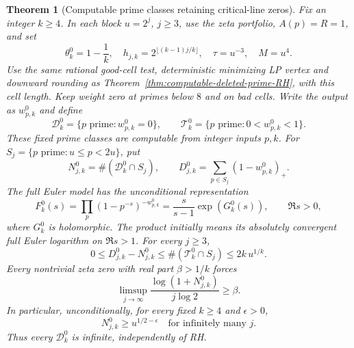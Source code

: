 \documentclass[11pt]{article}
\newtheorem{theorem}{Theorem}[section]
\theoremstyle{definition}
\begin{document}
\begin{theorem}[Computable prime classes retaining critical-line zeros]
\label{thm:critical-deleted-prime-model}
Fix an integer $k\ge4$. In each block $u=2^j$, $j\ge3$,
use the zeta portfolio, $A(p)=R=1$, and set
\begin{equation}
 \theta_k^0=1-\frac1k,\quad
 h_{j,k}=2^{\lfloor(k-1)j/k\rfloor},\quad
 \tau=u^{-3},\quad M=u^4.
 \label{eq:critical-prime-cell-scale}
\end{equation}
Use the same rational good-cell test, deterministic minimizing
LP vertex and downward rounding as
Theorem~\ref{thm:computable-deleted-prime-RH}, with this cell
length. Keep weight zero at primes below $8$ and on bad cells.
Write the output as $w^0_{p,k}$ and define
\[
 \mathcal D_k^0=\{p\text{ prime}:w^0_{p,k}=0\},\qquad
 \mathcal T_k^0=\{p\text{ prime}:0<w^0_{p,k}<1\}.
\]
These fixed prime classes are computable from integer inputs
$p,k$. For $S_j=\{p\text{ prime}:u\le p<2u\}$, put
\[
 N^0_{j,k}=\#(\mathcal D_k^0\cap S_j),\qquad
 D^0_{j,k}=\sum_{p\in S_j}(1-w^0_{p,k})_+.
\]
The full Euler model has the unconditional representation
\begin{equation}
 F_k^0(s)=\prod_p(1-p^{-s})^{-w^0_{p,k}}
       =\frac{s}{s-1}\exp(G_k^0(s)),\qquad \Re s>0,
 \label{eq:critical-prime-favorable-product}
\end{equation}
where $G_k^0$ is holomorphic. The product initially means its
absolutely convergent full Euler logarithm on $\Re s>1$.
For every $j\ge3$,
\begin{equation}
 0\le D^0_{j,k}-N^0_{j,k}
       \le\#(\mathcal T_k^0\cap S_j)\le2k\,u^{1/k}.
 \label{eq:critical-prime-count-ledger}
\end{equation}
Every nontrivial zeta zero with real part $\beta>1/k$ forces
\begin{equation}
 \limsup_{j\to\infty}
       \frac{\log(1+N^0_{j,k})}{j\log2}\ge\beta.
 \label{eq:critical-prime-zero-readout}
\end{equation}
In particular, unconditionally, for every fixed $k\ge4$
and $\epsilon>0$,
\begin{equation}
 N^0_{j,k}\ge u^{1/2-\epsilon}
                       \quad\text{for infinitely many }j.
 \label{eq:critical-prime-unconditional-infinitude}
\end{equation}
Thus every $\mathcal D_k^0$ is infinite, independently of RH.
\end{theorem}
\end{document}
